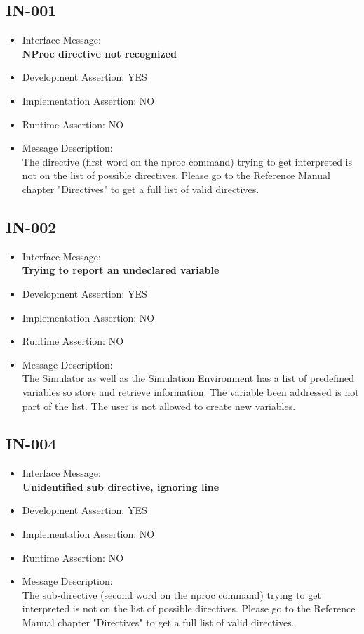 %
%

\subsection{IN-001}
\begin{itemize}
  \item Interface Message:\\[1em]
    \textbf{NProc directive not recognized}
  \item Development Assertion: YES
  \item Implementation Assertion: NO
  \item Runtime Assertion: NO
  \item Message Description:\\[1em]
    The directive (first word on the nproc command) trying to get interpreted is not on the list of possible directives. Please go to the Reference Manual chapter "Directives" to get a full list of valid directives.
\end{itemize}

\subsection{IN-002}
\begin{itemize}
  \item Interface Message:\\[1em]
    \textbf{Trying to report an undeclared variable}
  \item Development Assertion: YES
  \item Implementation Assertion: NO
  \item Runtime Assertion: NO
  \item Message Description:\\[1em]
    The Simulator as well as the Simulation Environment has a list of predefined variables so store and retrieve information. The variable been addressed is not part of the list. The user is not allowed to create new variables.
\end{itemize}

\subsection{IN-004}
\begin{itemize}
  \item Interface Message:\\[1em]
    \textbf{Unidentified sub directive, ignoring line}
  \item Development Assertion: YES
  \item Implementation Assertion: NO
  \item Runtime Assertion: NO
  \item Message Description:\\[1em]
    The sub-directive (second word on the nproc command)  trying to get interpreted is not on the list of possible directives. Please go to the Reference Manual chapter "Directives" to get a full list of valid directives.
\end{itemize}

